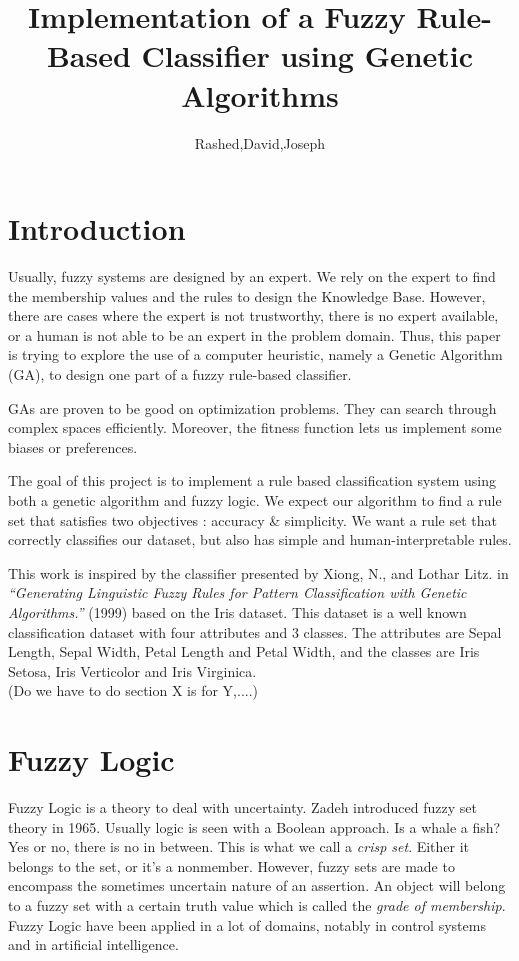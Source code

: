 \documentclass[a4paper,12pt]{article}
\begin{document}
\title{Implementation of a Fuzzy Rule-Based Classifier using Genetic Algorithms}
\author{Rashed,David,Joseph}
\maketitle



\section{Introduction}

Usually, fuzzy systems are designed by an expert. We rely on the expert to find the membership values and the rules to design the Knowledge Base.
However, there are cases where the expert is not trustworthy, there is no expert available, or a human is not able to be an expert in the problem domain. Thus, this paper is trying to explore the use of a computer heuristic, namely a Genetic Algorithm (GA), to design one part of a fuzzy rule-based classifier.

GAs are proven to be good on optimization problems. They can search through complex spaces efficiently. Moreover, the fitness function lets us implement some biases or preferences.

The goal of this project is to implement a rule based classification system using both a genetic algorithm and fuzzy logic.
We expect our algorithm to find a rule set that satisfies two objectives : accuracy \& simplicity.
We want a rule set that correctly classifies our dataset, but also has simple and human-interpretable rules.

This work is inspired by the classifier presented by Xiong, N., and Lothar Litz. in \textit{“Generating Linguistic Fuzzy Rules for Pattern Classification with Genetic Algorithms.”} (1999) based on the Iris dataset. This dataset is a well known classification dataset with four attributes and 3 classes. The attributes are Sepal Length, Sepal Width, Petal Length and Petal Width, and the classes are Iris Setosa, Iris Verticolor and Iris Virginica. \\

(Do we have to do section X is for Y,....)

\section{Fuzzy Logic}

Fuzzy Logic is a theory to deal with uncertainty.
Zadeh introduced fuzzy set theory in 1965. Usually logic is seen with a Boolean approach. Is a whale a fish? Yes or no, there is no in between. This is what we call a \textit{crisp set}. Either it belongs to the set, or it's a nonmember. 
However, fuzzy sets are made to encompass the sometimes uncertain nature of an assertion. An object will belong to a fuzzy set with a certain truth value which is called the \textit{grade of membership}.
Fuzzy Logic have been applied in a lot of domains, notably in control systems and in artificial intelligence.
\end{document}

